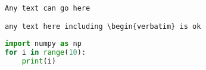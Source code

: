 \documentclass[12pt]{report}
\begin{document}
\lstlistoflistings

\vspace{5em} 

\begin{verbatim}
Any text can go here
\end{verbatim}

\vspace{5em} 

\verb|any text here including \begin{verbatim} is ok| %

\begin{lstlisting}[language=Python, caption=hello this is a test caption] 
import numpy as np 
for i in range(10):
    print(i)
\end{lstlisting}

\vspace{5em} 


\end{document}
